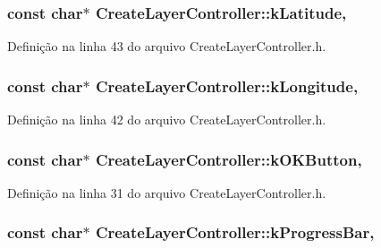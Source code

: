 \subsubsection[{k\+Latitude}]{\setlength{\rightskip}{0pt plus 5cm}const char$\ast$ Create\+Layer\+Controller\+::k\+Latitude\hspace{0.3cm}{\ttfamily [static]}, {\ttfamily [protected]}}\label{class_create_layer_controller_adb34ecba05c2a8e29828c4e883c4c71c}


Definição na linha 43 do arquivo Create\+Layer\+Controller.\+h.

\subsubsection[{k\+Longitude}]{\setlength{\rightskip}{0pt plus 5cm}const char$\ast$ Create\+Layer\+Controller\+::k\+Longitude\hspace{0.3cm}{\ttfamily [static]}, {\ttfamily [protected]}}\label{class_create_layer_controller_a89468a95f6550b07e19d59849a518420}


Definição na linha 42 do arquivo Create\+Layer\+Controller.\+h.

\subsubsection[{k\+O\+K\+Button}]{\setlength{\rightskip}{0pt plus 5cm}const char$\ast$ Create\+Layer\+Controller\+::k\+O\+K\+Button\hspace{0.3cm}{\ttfamily [static]}, {\ttfamily [protected]}}\label{class_create_layer_controller_a403bcd041ec8c8c78aa414ed88f9e1c2}


Definição na linha 31 do arquivo Create\+Layer\+Controller.\+h.

\subsubsection[{k\+Progress\+Bar}]{\setlength{\rightskip}{0pt plus 5cm}const char$\ast$ Create\+Layer\+Controller\+::k\+Progress\+Bar\hspace{0.3cm}{\ttfamily [static]}, {\ttfamily [protected]}}\label{class_create_layer_controller_ab64f51c651f3bfd061330c8d331aae78}


